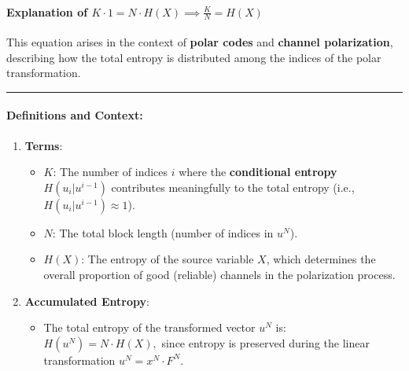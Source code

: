 \documentclass[11pt]{article}
\providecommand{\tightlist}{%
      \setlength{\itemsep}{0pt}\setlength{\parskip}{0pt}}
\begin{document}
\paragraph{\texorpdfstring{Explanation of
\(K \cdot 1 = N \cdot H(X) \implies \frac{K}{N} = H(X)\)}{Explanation of K \textbackslash cdot 1 = N \textbackslash cdot H(X) \textbackslash implies \textbackslash frac\{K\}\{N\} = H(X)}}\label{explanation-of-k-cdot-1-n-cdot-hx-implies-frackn-hx}

This equation arises in the context of \textbf{polar codes} and
\textbf{channel polarization}, describing how the total entropy is
distributed among the indices of the polar transformation.

\begin{center}\rule{0.5\linewidth}{0.5pt}\end{center}

\paragraph{Definitions and Context:}\label{definitions-and-context}

\begin{enumerate}
\def\labelenumi{\arabic{enumi}.}
\tightlist
\item
  \textbf{Terms}:

  \begin{itemize}
  \tightlist
  \item
    \(K\): The number of indices \(i\) where the \textbf{conditional
    entropy} \(H(u_i | u^{i-1})\) contributes meaningfully to the total
    entropy (i.e., \(H(u_i | u^{i-1}) \approx 1\)).
  \item
    \(N\): The total block length (number of indices in \(u^N\)).
  \item
    \(H(X)\): The entropy of the source variable \(X\), which determines
    the overall proportion of good (reliable) channels in the
    polarization process.
  \end{itemize}
\item
  \textbf{Accumulated Entropy}:

  \begin{itemize}
  \tightlist
  \item
    The total entropy of the transformed vector \(u^N\) is:
    \(H(u^N) = N \cdot H(X),\) since entropy is preserved during the
    linear transformation \(u^N = x^N \cdot F^N\).
  \end{itemize}
\end{enumerate}
\end{document}
